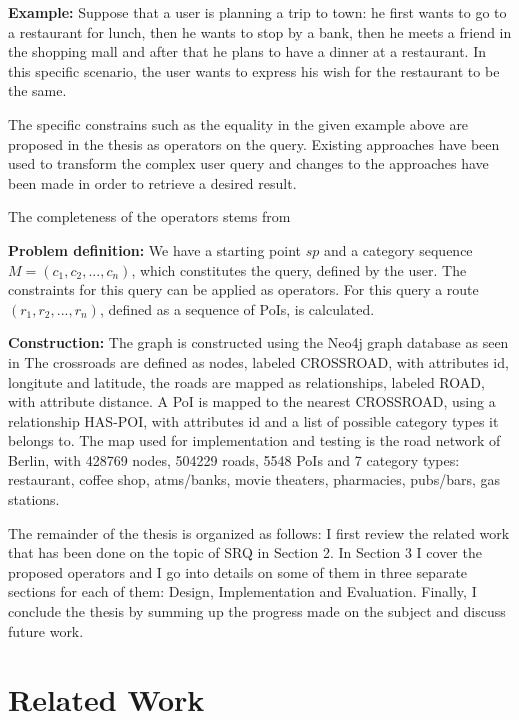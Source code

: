 \documentclass[12pt, a4paper]{book}
\begin{document}
\textbf{Example:}
Suppose that a user is planning a trip to town: he first wants to go to a restaurant for lunch, then he wants to stop by a bank, then he meets a friend in the shopping mall and after that he plans to have a dinner at a restaurant. In this specific scenario, the user wants to express his wish for the restaurant to be the same.

The specific constrains such as the equality in the given example above are proposed in the thesis as operators on the query. Existing approaches have been used to transform the complex user query and changes to the approaches have been made in order to retrieve a desired result. 

The completeness of the operators stems from %

\textbf{Problem definition:}
We have a starting point $sp$ and a category sequence $M = (c_1, c_2, ..., c_n)$, which constitutes the query, defined by the user. The constraints for this query can be applied as operators.
For this query a route $(r_1, r_2, ..., r_n)$, defined as a sequence of PoIs, is calculated.

\textbf{Construction:}
The graph is constructed using the Neo4j graph database as seen in %
The crossroads are defined as nodes, labeled CROSSROAD, with attributes id, longitute and latitude, the roads are mapped as relationships, labeled ROAD, with attribute distance. A PoI is mapped to the nearest CROSSROAD, using a relationship HAS-POI, with attributes id and a list of possible category types it belongs to. 
The map used for implementation and testing is the road network of Berlin, with 428769 nodes, 504229 roads, 5548 PoIs and 7 category types: restaurant, coffee shop, atms/banks, movie theaters, pharmacies, pubs/bars, gas stations. 
\newline

The remainder of the thesis is organized as follows: I first review the related work that has been done on the topic of SRQ in Section 2. In Section 3 I cover the proposed operators and I go into details on some of them in three separate sections for each of them: Design, Implementation and Evaluation. Finally, I conclude the thesis by summing up the progress made on the subject and discuss future work.

\cite{mach87ulvm}

\chapter{Related Work}
\label{sec:bgrelwork}
\end{document}

